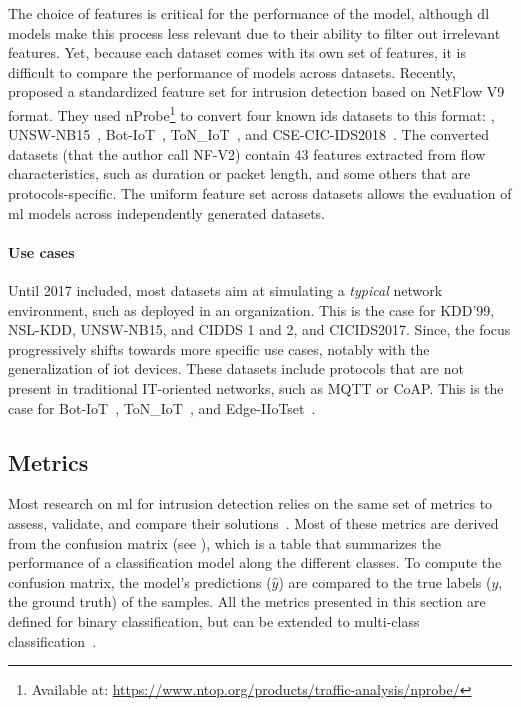 The choice of features is critical for the performance of the model, although \gls{dl} models make this process less relevant due to their ability to filter out irrelevant features.
Yet, because each dataset comes with its own set of features, it is difficult to compare the performance of models across datasets.
Recently, \textcite{sarhan_StandardFeatureSet_2022} proposed a standardized feature set for intrusion detection based on NetFlow V9~\cite{rfc3954} format.
They used nProbe\footnote{Available at: \url{https://www.ntop.org/products/traffic-analysis/nprobe/}} to convert four known \gls{ids} datasets to this format: \ie, UNSW-NB15~\cite{moustafa_UNSWNB15comprehensivedata_2015}, Bot-IoT~\cite{koroniotis_developmentrealisticbotnet_2019}, ToN\_IoT~\cite{moustafa_newdistributedarchitecture_2021}, and CSE-CIC-IDS2018~\cite{sharafaldin_GeneratingNewIntrusion_2018}.
The converted datasets (that the author call NF-V2) contain 43 features extracted from flow characteristics, such as duration or packet length, and some others that are protocols-specific.
The uniform feature set across datasets allows the evaluation of \gls{ml} models across independently generated datasets.

\paragraph{Use cases}

Until 2017 included, most datasets aim at simulating a \emph{typical} network environment, such as deployed in an organization.
This is the case for KDD'99, NSL-KDD, UNSW-NB15, and CIDDS 1 and 2, and CICIDS2017.
Since, the focus progressively shifts towards more specific use cases, notably with the generalization of \gls{iot} devices.
These datasets include protocols that are not present in traditional IT-oriented networks, such as MQTT or CoAP.
This is the case for Bot-IoT~\cite{koroniotis_developmentrealisticbotnet_2019}, ToN\_IoT~\cite{moustafa_newdistributedarchitecture_2021}, and Edge-IIoTset~\cite{ferrag_EdgeIIoTsetNewComprehensive_2022}.




\subsection{Metrics\label{sec:bg.ids.metrics}}

Most research on \gls{ml} for intrusion detection relies on the same set of metrics to assess, validate, and compare their solutions~\cite{chaabouni_NetworkIntrusionDetection_2019,faraj_Taxonomychallengesmachine_2020,buczak_SurveyDataMining_2016}.
Most of these metrics are derived from the confusion matrix (see ), which is a table that summarizes the performance of a classification model along the different classes.
To compute the confusion matrix, the model's predictions ($\hat{y}$) are compared to the true labels ($y$, the ground truth) of the samples.
All the metrics presented in this section are defined for binary classification, but can be extended to multi-class classification~\cite{buczak_SurveyDataMining_2016}.

